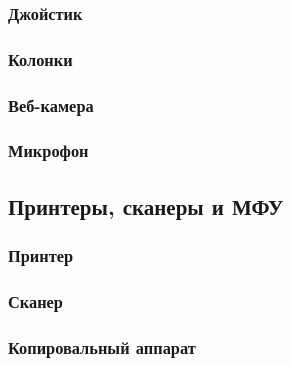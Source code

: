 \subsubsection{Джойстик}\label{base:introduction:components:peripheral:joystick}

\subsubsection{Колонки}\label{base:introduction:components:peripheral:loudspeaker}

\subsubsection{Веб-камера}\label{base:introduction:components:peripheral:webcam}

\subsubsection{Микрофон}\label{base:introduction:components:peripheral:microphone}

\subsection{Принтеры, сканеры и МФУ}\label{base:introduction:components:printers}
\subsubsection{Принтер}\label{base:introduction:components:printers:printer}

\subsubsection{Сканер}\label{base:introduction:components:printers:scanner}

\subsubsection{Копировальный аппарат}\label{base:introduction:components:printers:copier}


